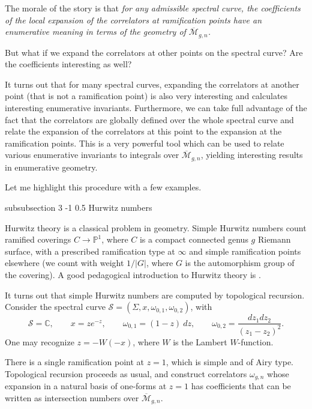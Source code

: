 \documentclass[reqno,oneside,11pt]{amsart}
\makeatletter
\theoremstyle{plain}
\theoremstyle{definition}
\theoremstyle{remark}
\numberwithin{equation}{section}
\renewcommand{\subsubsection}{\@startsection
{subsubsection}%
{3}%
{\z@}%
{-1\baselineskip}%
{0.5\baselineskip}%
{\normalfont \it \normalsize}} %
\makeatother
\begin{document}
The morale of the story is that \emph{for any admissible spectral curve, the coefficients of the local expansion of the correlators at ramification points have an enumerative meaning in terms of the geometry of $\overline{\mathcal{M}}_{g,n}$.}

But what if we expand the correlators at other points on the spectral curve? Are the coefficients interesting as well?

 It turns out that for many spectral curves, expanding the correlators at another point (that is not a ramification point) is also very interesting and calculates interesting enumerative invariants. Furthermore, we can take full advantage of the fact that the correlators are globally defined over the whole spectral curve and relate the expansion of the correlators at this point to the expansion at the ramification points. This is a very powerful tool which can be used to relate various enumerative invariants to integrals over $\overline{\mathcal{M}}_{g,n}$, yielding interesting results in enumerative geometry.
 
Let me highlight this procedure with a few examples.
 
 \subsubsection{Hurwitz numbers}
 
 Hurwitz theory is a classical problem in geometry. Simple Hurwitz numbers count ramified coverings $ C \to \mathbb{P}^1$, where $C$ is a compact connected genus $g$ Riemann surface, with a prescribed ramification type at $\infty$ and simple ramification points elsewhere (we count with weight $1/|G|$, where $G$ is the automorphism group of the covering).  A good pedagogical introduction to Hurwitz theory is \cite{Ca16}.
 
 It turns out that simple Hurwitz numbers are computed by topological recursion. Consider the spectral curve $\mathcal{S} = (\Sigma, x, \omega_{0,1}, \omega_{0,2})$, with 
 \begin{equation}
 \mathcal{S} = \mathbb{C}, \qquad x = z e^{-z}, \qquad \omega_{0,1} = (1-z)\ dz, \qquad \omega_{0,2} = \frac{dz_1 dz_2}{(z_1-z_2)^2}.
 \end{equation}
 One may recognize $z= - W(-x)$, where $W$ is the Lambert $W$-function.
 
 There is a single ramification point at $z=1$, which is simple and of Airy type. Topological recursion proceeds as usual, and construct correlators $\omega_{g,n}$ whose expansion in a natural basis of one-forms at $z=1$ has coefficients that can be written as intersection numbers over $\overline{\mathcal{M}}_{g,n}$. 
 
\end{document}
